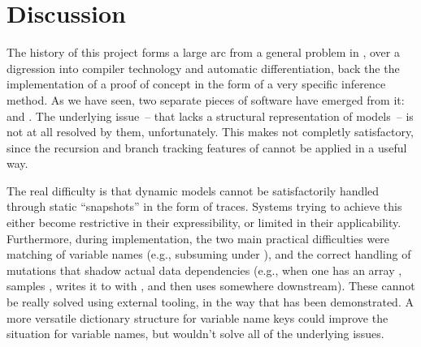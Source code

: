 \chapter{Discussion}
\label{cha:discussion}

The history of this project forms a large arc from a general problem in \turingjl{}, over a
digression into compiler technology and automatic differentiation, back the the implementation of a
proof of concept in the form of a very specific inference method.  As we have seen, two separate
pieces of software have emerged from it: \irtrackerjl{} and \autogibbsjl{}.  The underlying issue~--
that \turingjl{} lacks a structural representation of models~-- is not at all resolved by them,
unfortunately.  This makes \autogibbsjl{} not completly satisfactory, since the recursion and branch
tracking features of \irtrackerjl{} cannot be applied in a useful way.

The real difficulty is that dynamic models cannot be satisfactorily handled through static
\enquote{snapshots} in the form of traces.  Systems trying to achieve this either become restrictive
in their expressibility, or limited in their applicability. Furthermore, during implementation, the two main practical difficulties were matching of
variable names (e.g., subsuming  under ), and the correct handling
of mutations that shadow actual data dependencies (e.g., when one has an array , samples
, writes it to  with , and then uses 
somewhere downstream).  These cannot be really solved using external tooling, in the way that has
been demonstrated.  A more versatile dictionary structure for variable name keys could improve the
situation for variable names, but wouldn't solve all of the underlying issues.

